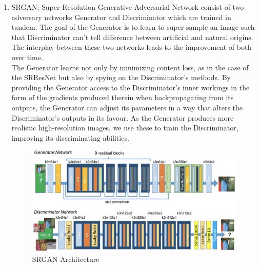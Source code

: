 \begin{enumerate}
    \item SRGAN: Super-Resolution Generative Adversarial Network consist of two adversary networks Generator and Discriminator which are trained in tandem. The goal of the Generator is to learn to super-sample an image such that Discriminator can’t tell difference between artificial and natural origins. The interplay between these two networks leads to the improvement of both over time. \\
    The Generator learns not only by minimizing content loss, as in the case of the SRResNet but also by spying on the Discriminator's methods. By providing the Generator access to the Discriminator's inner workings in the form of the gradients produced therein when backpropagating from its outputs, the Generator can adjust its parameters in a way that alters the Discriminator's outputs in its favour. As the Generator produces more realistic high-resolution images, we use these to train the Discriminator, improving its discriminating abilities.
    \begin{figure}[ht]
        \centering
        \includegraphics[width=6in]{./figures/architecture.png}
        \caption{SRGAN Architecture}
    \end{figure}


\end{enumerate}
